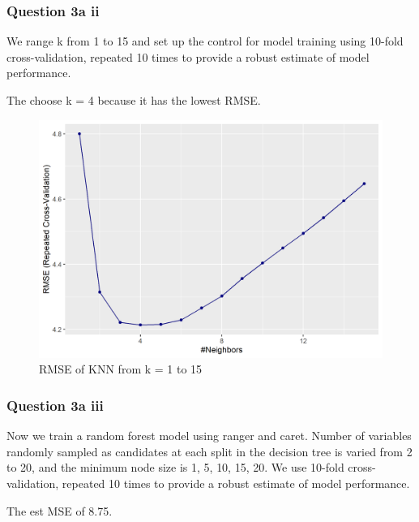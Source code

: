 \documentclass[
]{article}
\begin{document}
\hypertarget{question-3a-ii}{%
\subsubsection{Question 3a ii}\label{question-3a-ii}}

We range k from 1 to 15 and set up the control for model training using
10-fold cross-validation, repeated 10 times to provide a robust estimate
of model performance.

The choose k = 4 because it has the lowest RMSE.

\begin{figure}
\centering
\includegraphics[width=4.875in,height=\textheight]{rmse_knn.png}
\caption{RMSE of KNN from k = 1 to 15}
\end{figure}

\hypertarget{question-3a-iii}{%
\subsubsection{Question 3a iii}\label{question-3a-iii}}

Now we train a random forest model using ranger and caret. Number of
variables randomly sampled as candidates at each split in the decision
tree is varied from 2 to 20, and the minimum node size is 1, 5, 10, 15,
20. We use 10-fold cross-validation, repeated 10 times to provide a
robust estimate of model performance.

The est MSE of 8.75.
\end{document}
